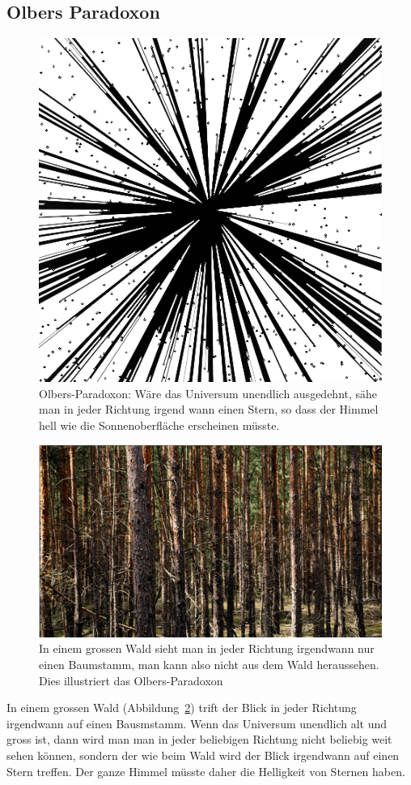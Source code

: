 \subsection{Olbers Paradoxon}
\begin{figure}
\centering
\includegraphics[width=\hsize]{chapters/tikz/wald.pdf}
\caption{Olbers-Paradoxon: Wäre das Universum unendlich ausgedehnt,
sähe man in jeder Richtung irgend wann einen Stern, so dass der Himmel
hell wie die Sonnenoberfläche erscheinen müsste.
\label{skript:figure:waldolbers}}
\end{figure}
\begin{figure}
\centering
\includegraphics[width=\hsize]{chapters/images/wald50.jpg}
\caption{In einem grossen Wald sieht man in jeder Richtung irgendwann
nur einen Baumstamm, man kann also nicht aus dem Wald heraussehen.
Dies illustriert das Olbers-Paradoxon
\label{skript:robertson:olberswald}}
\end{figure}
In einem grossen Wald (Abbildung~\ref{skript:robertson:olberswald})
trift der Blick in jeder Richtung irgendwann auf einen Bausmstamm.
Wenn das Universum unendlich alt und gross ist, dann wird man
man in jeder beliebigen Richtung nicht beliebig weit sehen können,
sondern der wie beim Wald wird der Blick irgendwann auf einen Stern treffen.
Der ganze Himmel müsste daher die Helligkeit von Sternen haben.

